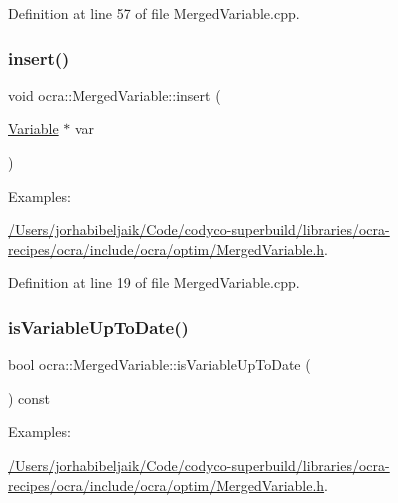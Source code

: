 Definition at line 57 of file Merged\+Variable.\+cpp.

\hypertarget{classocra_1_1MergedVariable_aa91f4ed9514c3dd4bf1ae4e25cf1e118}{}\label{classocra_1_1MergedVariable_aa91f4ed9514c3dd4bf1ae4e25cf1e118} 
\subsubsection{\texorpdfstring{insert()}{insert()}}
{\footnotesize\ttfamily void ocra\+::\+Merged\+Variable\+::insert (\begin{DoxyParamCaption}\item[{\hyperlink{classocra_1_1Variable}{Variable} $\ast$}]{var }\end{DoxyParamCaption})}

\begin{Desc}
\item[Examples\+: ]\par
\hyperlink{_2Users_2jorhabibeljaik_2Code_2codyco-superbuild_2libraries_2ocra-recipes_2ocra_2include_2ocra_27dfe52ed2d2fe1904154f5be9150e8b1}{/\+Users/jorhabibeljaik/\+Code/codyco-\/superbuild/libraries/ocra-\/recipes/ocra/include/ocra/optim/\+Merged\+Variable.\+h}.\end{Desc}


Definition at line 19 of file Merged\+Variable.\+cpp.

\hypertarget{classocra_1_1MergedVariable_a1da61e970d1c32c9ad94da57914d5aeb}{}\label{classocra_1_1MergedVariable_a1da61e970d1c32c9ad94da57914d5aeb} 
\subsubsection{\texorpdfstring{is\+Variable\+Up\+To\+Date()}{isVariableUpToDate()}}
{\footnotesize\ttfamily bool ocra\+::\+Merged\+Variable\+::is\+Variable\+Up\+To\+Date (\begin{DoxyParamCaption}{ }\end{DoxyParamCaption}) const}

\begin{Desc}
\item[Examples\+: ]\par
\hyperlink{_2Users_2jorhabibeljaik_2Code_2codyco-superbuild_2libraries_2ocra-recipes_2ocra_2include_2ocra_27dfe52ed2d2fe1904154f5be9150e8b1}{/\+Users/jorhabibeljaik/\+Code/codyco-\/superbuild/libraries/ocra-\/recipes/ocra/include/ocra/optim/\+Merged\+Variable.\+h}.\end{Desc}


